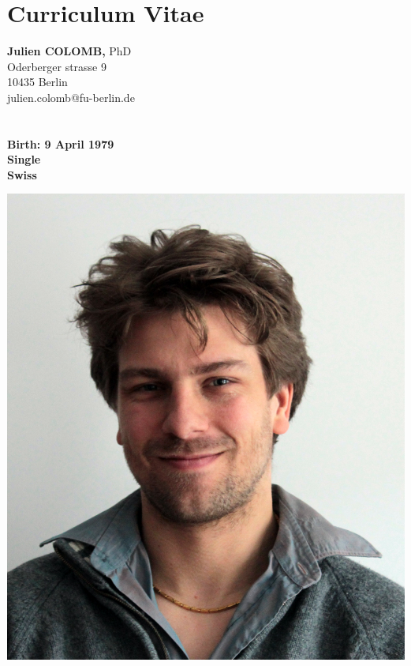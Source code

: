 
\section* {Curriculum Vitae}



\newcommand{\rubrique}[1]{{\textit{\textbf{\large#1}}}\smallskip\\}
\parindent=0in
\addtolength{\parskip}{1.4em}


\small

\begin{minipage}[t]{\textwidth}
    \begin{minipage}[b]{0.5\textwidth}
        \textbf{\Large Julien COLOMB}{\large \textbf, PhD}\\
        Oderberger strasse 9\\
        10435 Berlin\\
        julien.colomb@fu-berlin.de\\
        \\
        \\
        \textbf{Birth: 9 April 1979}\\
        \textbf{Single}\\
        \textbf{Swiss}
    \end{minipage}\hfill
    \begin{minipage}[b]{0.5\textwidth}
        \begin{flushright}
            \includegraphics[scale=1.3] {figures/photo_CV.jpg}

\end{flushright}
\end{minipage}
\end{minipage}
